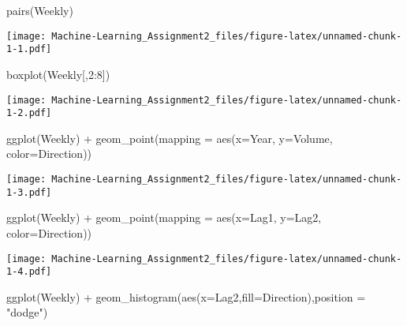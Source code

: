 \documentclass[
]{article}
\newenvironment{Shaded}{\begin{snugshade}}{\end{snugshade}}
\newcommand{\AttributeTok}[1]{\textcolor[rgb]{0.77,0.63,0.00}{#1}}
\newcommand{\DecValTok}[1]{\textcolor[rgb]{0.00,0.00,0.81}{#1}}
\newcommand{\FunctionTok}[1]{\textcolor[rgb]{0.00,0.00,0.00}{#1}}
\newcommand{\NormalTok}[1]{#1}
\newcommand{\SpecialCharTok}[1]{\textcolor[rgb]{0.00,0.00,0.00}{#1}}
\newcommand{\StringTok}[1]{\textcolor[rgb]{0.31,0.60,0.02}{#1}}
\begin{document}
\begin{Shaded}
\begin{Highlighting}[]
\FunctionTok{pairs}\NormalTok{(Weekly)}
\end{Highlighting}
\end{Shaded}

\texttt{[image: Machine-Learning\_Assignment2\_files/figure-latex/unnamed-chunk-1-1.pdf]}

\begin{Shaded}
\begin{Highlighting}[]
\FunctionTok{boxplot}\NormalTok{(Weekly[,}\DecValTok{2}\SpecialCharTok{:}\DecValTok{8}\NormalTok{])}
\end{Highlighting}
\end{Shaded}

\texttt{[image: Machine-Learning\_Assignment2\_files/figure-latex/unnamed-chunk-1-2.pdf]}

\begin{Shaded}
\begin{Highlighting}[]
\FunctionTok{ggplot}\NormalTok{(Weekly) }\SpecialCharTok{+}  
  \FunctionTok{geom\_point}\NormalTok{(}\AttributeTok{mapping =} \FunctionTok{aes}\NormalTok{(}\AttributeTok{x=}\NormalTok{Year, }\AttributeTok{y=}\NormalTok{Volume, }\AttributeTok{color=}\NormalTok{Direction))}
\end{Highlighting}
\end{Shaded}

\texttt{[image: Machine-Learning\_Assignment2\_files/figure-latex/unnamed-chunk-1-3.pdf]}

\begin{Shaded}
\begin{Highlighting}[]
\FunctionTok{ggplot}\NormalTok{(Weekly) }\SpecialCharTok{+}  
  \FunctionTok{geom\_point}\NormalTok{(}\AttributeTok{mapping =} \FunctionTok{aes}\NormalTok{(}\AttributeTok{x=}\NormalTok{Lag1, }\AttributeTok{y=}\NormalTok{Lag2, }\AttributeTok{color=}\NormalTok{Direction))}
\end{Highlighting}
\end{Shaded}

\texttt{[image: Machine-Learning\_Assignment2\_files/figure-latex/unnamed-chunk-1-4.pdf]}

\begin{Shaded}
\begin{Highlighting}[]
\FunctionTok{ggplot}\NormalTok{(Weekly) }\SpecialCharTok{+}
  \FunctionTok{geom\_histogram}\NormalTok{(}\FunctionTok{aes}\NormalTok{(}\AttributeTok{x=}\NormalTok{Lag2,}\AttributeTok{fill=}\NormalTok{Direction),}\AttributeTok{position =} \StringTok{"dodge"}\NormalTok{)}
\end{Highlighting}
\end{Shaded}
\end{document}
